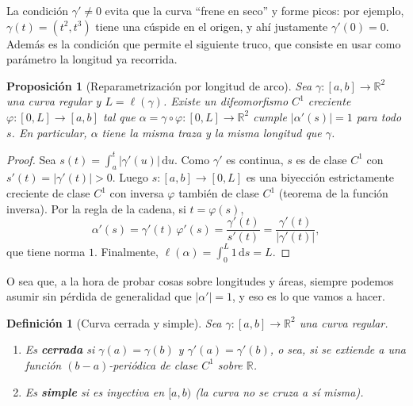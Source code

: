\documentclass[12pt,a4paper]{article}
\theoremstyle{profesional}
\newtheorem{proposicion}[teorema]{Proposición}
\theoremstyle{definicion-style}
\newtheorem{definicion}[teorema]{Definición}
\newcommand{\R}{\mathbb{R}}
\newcommand{\abs}[1]{\left| #1 \right|}
\begin{document}
La condición \( \gamma' \neq 0 \) evita que la curva ``frene en seco'' y forme picos: por ejemplo, \( \gamma(t) = (t^2, t^3) \) tiene una cúspide en el origen, y ahí justamente \( \gamma'(0) = 0 \).
Además es la condición que permite el siguiente truco, que consiste en usar como parámetro la longitud ya recorrida.

\begin{proposicion}[Reparametrización por longitud de arco]\label{prop:arco}
    Sea \( \gamma : [a, b] \to \R^2 \) una curva regular y \( L = \ell(\gamma) \). Existe un difeomorfismo \( C^1 \) creciente \( \varphi : [0, L] \to [a, b] \) tal que
    \( \alpha = \gamma \circ \varphi : [0, L] \to \R^2 \) cumple \( \abs{\alpha'(s)} = 1 \) para todo \( s \). En particular, \( \alpha \) tiene la misma traza y la misma longitud que \( \gamma \).
\end{proposicion}
\begin{proof}
    Sea \( s(t) = \int_a^t \abs{\gamma'(u)} \, \mathrm{d}u \). Como \( \gamma' \) es continua, \( s \) es de clase \( C^1 \) con \( s'(t) = \abs{\gamma'(t)} > 0 \). Luego
    \( s : [a, b] \to [0, L] \) es una biyección estrictamente creciente de clase \( C^1 \) con inversa \( \varphi \) también de clase \( C^1 \) (teorema de la función inversa).
    Por la regla de la cadena, si \( t = \varphi(s) \),
    \[
        \alpha'(s) = \gamma'(t) \, \varphi'(s) = \frac{\gamma'(t)}{s'(t)} = \frac{\gamma'(t)}{\abs{\gamma'(t)}},
    \]
    que tiene norma \( 1 \). Finalmente, \( \ell(\alpha) = \int_0^L 1 \, \mathrm{d}s = L \).
\end{proof}

O sea que, a la hora de probar cosas sobre longitudes y áreas, siempre podemos asumir sin pérdida de generalidad que \( \abs{\alpha'} = 1 \), y eso es lo que vamos a hacer.

\begin{definicion}[Curva cerrada y simple]
    Sea \( \gamma : [a, b] \to \R^2 \) una curva regular.
    \begin{enumerate}[label=\arabic*.]
        \item Es \textbf{cerrada} si \( \gamma(a) = \gamma(b) \) y \( \gamma'(a) = \gamma'(b) \), o sea, si se extiende a una función \( (b-a) \)-periódica de clase \( C^1 \) sobre \( \R \).
        \item Es \textbf{simple} si es inyectiva en \( [a, b) \) (la curva no se cruza a sí misma).
    \end{enumerate}
\end{definicion}
\end{document}

